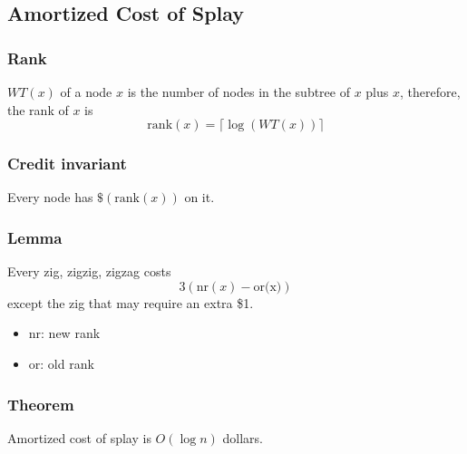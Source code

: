 \subsection{Amortized Cost of Splay}

\subsubsection{Rank}
\begin{definition}
    $WT(x)$ of a node $x$ is the number of nodes in the subtree of $x$ plus $x$, therefore, the rank of $x$ is 
    \begin{equation*}
        \text{rank}(x) = \lceil \log(WT(x)) \rceil
    \end{equation*}
\end{definition}

\subsubsection{Credit invariant}
\begin{definition}
    Every node has $\$(\text{rank}(x))$ on it. 
\end{definition}

\subsubsection{Lemma}
\begin{theorem}
    Every zig, zigzig, zigzag costs 
    \begin{equation*}
        3(\text{nr}(x) - \text{or(x)})
    \end{equation*}    
    except the zig that may require an extra \$1.
    \begin{itemize}
        \item nr: new rank
        \item or: old rank
    \end{itemize}
\end{theorem}

\begin{derivation}
\end{derivation}

\subsubsection{Theorem}
\begin{theorem}
    Amortized cost of splay is $O(\log n)$ dollars. 
\end{theorem}

\begin{derivation}
\end{derivation}


